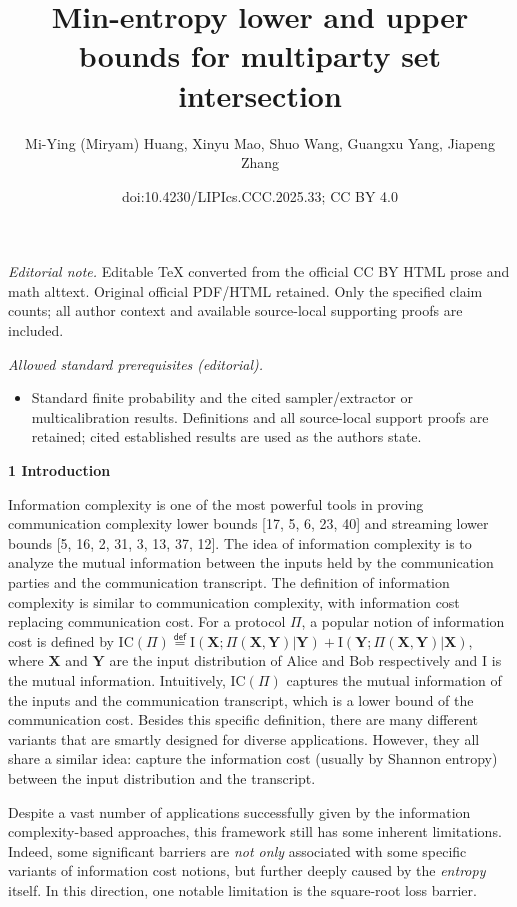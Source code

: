 \documentclass[10pt,a4paper]{article}
\title{Min-entropy lower and upper bounds for multiparty set intersection}
\author{Mi-Ying (Miryam) Huang, Xinyu Mao, Shuo Wang, Guangxu Yang, Jiapeng Zhang}
\date{doi:10.4230/LIPIcs.CCC.2025.33; CC BY 4.0}
\begin{document}
\maketitle
\noindent\textit{Editorial note.} Editable TeX converted from the official CC BY HTML prose and math alttext. Original official PDF/HTML retained. Only the specified claim counts; all author context and available source-local supporting proofs are included.\par\medskip
\noindent\textit{Allowed standard prerequisites (editorial).}\begin{itemize}
\item Standard finite probability and the cited sampler/extractor or multicalibration results. Definitions and all source-local support proofs are retained; cited established results are used as the authors state.
\end{itemize}\medskip


\par\medskip\noindent\textbf{
1 Introduction}\par




Information complexity is one of the most powerful tools in proving communication complexity lower bounds [17, 5, 6, 23, 40] and streaming lower bounds [5, 16, 2, 31, 3, 13, 37, 12]. The idea of information complexity is to analyze the mutual information between the inputs held by the communication parties and the communication transcript. The definition of information complexity is similar to communication complexity, with information cost replacing communication cost. For a protocol $\Pi$, a popular notion of information cost is defined by
$\text{IC}(\Pi)\stackrel{{\scriptstyle\mathsf{def}}}{{=}}\text{I}(\bm{X};\Pi(\bm{X},\bm{Y})|\bm{Y})+\text{I}(\bm{Y};\Pi(\bm{X},\bm{Y})|\bm{X})$, where $\bm{X}$ and $\bm{Y}$ are the input distribution of Alice and Bob respectively and I is the mutual information. Intuitively, $\text{IC}(\Pi)$ captures the mutual information of the inputs and the communication transcript, which is a lower bound of the communication cost. Besides this specific definition, there are many different variants that are smartly designed for diverse applications. However, they all share a similar idea: capture the information cost (usually by Shannon entropy) between the input distribution and the transcript.\par




Despite a vast number of applications successfully given by the information complexity-based approaches, this framework still has some inherent limitations. Indeed, some significant barriers are \emph{not only} associated with some specific variants of information cost notions, but further deeply caused by the \emph{entropy} itself. In this direction, one notable limitation is the square-root loss barrier.\par
\end{document}
